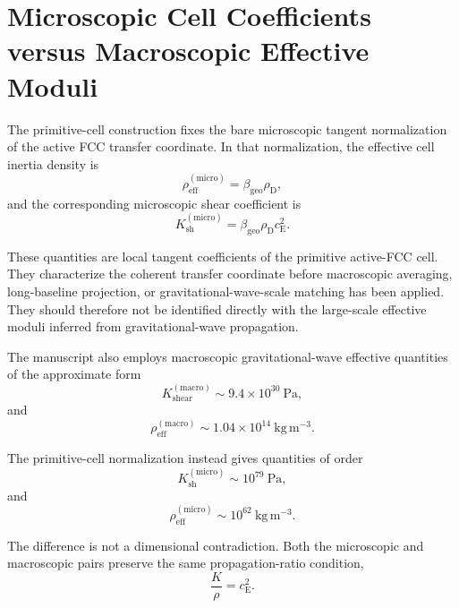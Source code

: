 \section{Microscopic Cell Coefficients versus Macroscopic Effective Moduli}

The primitive-cell construction fixes the bare microscopic tangent normalization of the active FCC transfer coordinate. In that normalization, the effective cell inertia density is
\begin{equation}
    \rho_{\mathrm{eff}}^{(\mathrm{micro})} = \beta_{\mathrm{geo}}\rho_{\mathrm{D}},
\end{equation}
and the corresponding microscopic shear coefficient is
\begin{equation}
    K_{\mathrm{sh}}^{(\mathrm{micro})} = \beta_{\mathrm{geo}}\rho_{\mathrm{D}}c_{\mathrm{E}}^2.
\end{equation}

These quantities are local tangent coefficients of the primitive active-FCC cell. They characterize the coherent transfer coordinate before macroscopic averaging, long-baseline projection, or gravitational-wave-scale matching has been applied. They should therefore not be identified directly with the large-scale effective moduli inferred from gravitational-wave propagation.

The manuscript also employs macroscopic gravitational-wave effective quantities of the approximate form
\begin{equation}
    K_{\mathrm{shear}}^{(\mathrm{macro})} \sim 9.4\times10^{30}\ \mathrm{Pa},
\end{equation}
and
\begin{equation}
    \rho_{\mathrm{eff}}^{(\mathrm{macro})} \sim 1.04\times10^{14}\ \mathrm{kg\,m^{-3}}.
\end{equation}

The primitive-cell normalization instead gives quantities of order
\begin{equation}
    K_{\mathrm{sh}}^{(\mathrm{micro})} \sim 10^{79}\ \mathrm{Pa},
\end{equation}
and
\begin{equation}
    \rho_{\mathrm{eff}}^{(\mathrm{micro})} \sim 10^{62}\ \mathrm{kg\,m^{-3}}.
\end{equation}

The difference is not a dimensional contradiction. Both the microscopic and macroscopic pairs preserve the same propagation-ratio condition,
\begin{equation}
    \frac{K}{\rho} = c_{\mathrm{E}}^2.
\end{equation}

